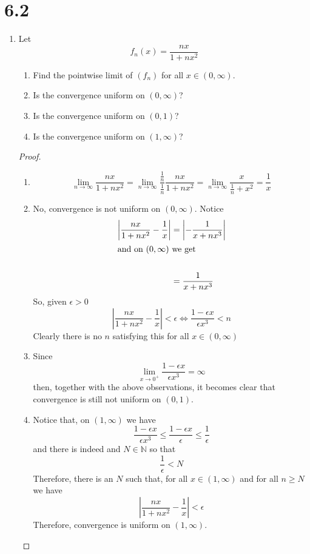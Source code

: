 \section*{6.2}
\begin{enumerate}
    \item Let
    \[
    f_n(x) = \frac{nx}{1+nx^2}
    \]
    \begin{enumerate}
        \item Find the pointwise limit of \( (f_n) \) for all \( x \in (0, \infty) \).
        \item Is the convergence uniform on \( (0, \infty) \)?
        \item Is the convergence uniform on \( (0,1) \)?
        \item Is the convergence uniform on \( (1, \infty) \)?
    \end{enumerate}
    
    \begin{proof}
    \begin{enumerate}
        \item
        \[
        \lim_{n \rightarrow \infty} \frac{nx}{1+nx^2} = \lim_{n \rightarrow \infty} \frac{\frac{1}{n}}{\frac{1}{n}} \frac{nx}{1+nx^2} = \lim_{n \rightarrow \infty} \frac{x}{\frac{1}{n} + x^2} = \frac{1}{x}
        \]
        
        \item No, convergence is not uniform on \( (0, \infty) \). Notice
        \begin{align*}
            \left| \frac{nx}{1 + nx^2} - \frac{1}{x} \right| &= \left| - \frac{1}{x+nx^3} \right| \\
            \intertext{and on \( (0, \infty) \) we get} \\
            &= \frac{1}{x+nx^3}
        \end{align*}
        So, given \( \epsilon > 0 \)
        \[
        \left| \frac{nx}{1+nx^2} - \frac{1}{x} \right| < \epsilon \iff \frac{1-\epsilon x}{\epsilon x^3} < n
        \]
        Clearly there is no \( n \) satisfying this for all \( x \in (0, \infty) \)
        
        \item Since 
        \[
        \lim_{x \rightarrow 0^+} \frac{1-\epsilon x}{\epsilon x^3} = \infty
        \]
        then, together with the above observations, it becomes clear that convergence is still not uniform on \( (0,1) \). 
        
        \item Notice that, on \( (1, \infty) \) we have
        \[
        \frac{1-\epsilon x}{\epsilon x^3} \leq \frac{1-\epsilon x}{\epsilon} \leq \frac{1}{\epsilon} 
        \]
        and there is indeed and \( N \in \mathbb{N} \) so that 
        \[
        \frac{1}{\epsilon} < N
        \]
        Therefore, there is an \( N \) such that, for all \( x \in (1, \infty) \) and for all \( n \geq N \) we have
        \[
        \left| \frac{nx}{1+nx^2} - \frac{1}{x} \right| < \epsilon
        \]
        Therefore, convergence is uniform on \( (1, \infty) \).
    \end{enumerate}
    \end{proof}
    

\end{enumerate}
